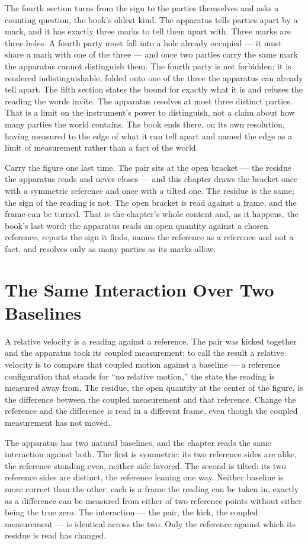 The fourth section turns from the sign to the parties themselves and asks a counting
question, the book's oldest kind. The apparatus tells parties apart by a mark, and it has
exactly three marks to tell them apart with. Three marks are three holes. A fourth party
must fall into a hole already occupied --- it must share a mark with one of the three --- and
once two parties carry the same mark the apparatus cannot distinguish them. The fourth
party is not forbidden; it is rendered indistinguishable, folded onto one of the three the
apparatus can already tell apart. The fifth section states the bound for exactly what it is
and refuses the reading the words invite. The apparatus resolves at most three distinct
parties. That is a limit on the instrument's power to distinguish, not a claim about how
many parties the world contains. The book ends there, on its own resolution, having
measured to the edge of what it can tell apart and named the edge as a limit of measurement
rather than a fact of the world.

Carry the figure one last time. The pair sits at the open bracket --- the residue the
apparatus reads and never closes --- and this chapter draws the bracket once with a symmetric
reference and once with a tilted one. The residue is the same; the sign of the reading is
not. The open bracket is read against a frame, and the frame can be turned. That is the
chapter's whole content and, as it happens, the book's last word: the apparatus reads an
open quantity against a chosen reference, reports the sign it finds, names the reference as
a reference and not a fact, and resolves only as many parties as its marks allow.

\section{The Same Interaction Over Two Baselines}

A relative velocity is a reading against a reference. The pair was kicked together and the
apparatus took its coupled measurement; to call the result a relative velocity is to compare
that coupled motion against a baseline --- a reference configuration that stands for ``no
relative motion,'' the state the reading is measured away from. The residue, the open
quantity at the center of the figure, is the difference between the coupled measurement and
that reference. Change the reference and the difference is read in a different frame, even
though the coupled measurement has not moved.

The apparatus has two natural baselines, and the chapter reads the same interaction against
both. The first is symmetric: its two reference sides are alike, the reference standing
even, neither side favored. The second is tilted: its two reference sides are distinct, the
reference leaning one way. Neither baseline is more correct than the other; each is a frame
the reading can be taken in, exactly as a difference can be measured from either of two
reference points without either being the true zero. The interaction --- the pair, the kick,
the coupled measurement --- is identical across the two. Only the reference against which its
residue is read has changed.


